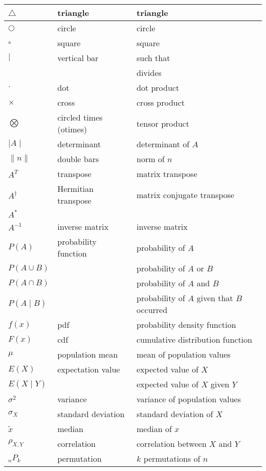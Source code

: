 \documentclass{article}
\begin{document}
\begin{longtable}{|| L{1.7cm} | L{3.5cm} | L{7cm} ||}
\hline
\(\bigtriangleup\) & triangle & triangle\\
\hline
\(\bigcirc\) & circle & circle\\
\hline
\(\square\) & square & square\\
\hline
\(\mid\) & vertical bar & such that\\
& & divides\\
\hline
\(\cdot\) & dot & dot product\\
\hline
\(\times\) & cross & cross product\\
\hline
\(\bigotimes\) & circled times (otimes) & tensor product\\
\hline
\(\mid{A}\mid\) & determinant & determinant of \(A\)\\
\hline
\(\parallel{n}\parallel\) & double bars & norm of \(n\)\\
\hline
\(A^{T}\) & transpose & matrix transpose\\
\hline
\(A^{\dagger}\) & Hermitian transpose & matrix conjugate transpose\\
\(A^{\ast}\) & & \\
\hline
\(A^{-1}\) & inverse matrix & inverse matrix\\
\hline
\(P(A)\) & probability function & probability of \(A\)\\
\(P(A \cup B)\) & & probability of \(A\) or \(B\)\\
\(P(A \cap B)\) & & probability of \(A\) and \(B\)\\
\(P(A \mid B)\) & & probability of \(A\) given that \(B\) occurred\\
\hline
\(f(x)\) & pdf & probability density function\\
\hline
\(F(x)\) & cdf & cumulative distribution function\\
\hline
\(\mu\) & population mean & mean of population values\\
\hline
\(E(X)\) & expectation value & expected value of \(X\)\\
\(E(X \mid Y)\) & & expected value of \(X\) given \(Y\)\\
\hline
\(\sigma^{2}\) & variance & variance of population values\\
\hline
\(\sigma_{X}\) & standard deviation & standard deviation of \(X\)\\
\hline
\(\tilde{x}\) & median & median of \(x\)\\
\hline
\(\rho_{X,Y}\) & correlation & correlation between \(X\) and \(Y\)\\
\hline
\(_{n}P_{k}\) & permutation & \(k\) permutations of \(n\)\\

\end{longtable}
\end{document}
